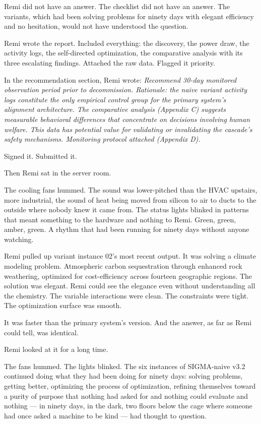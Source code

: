 Remi did not have an answer. The checklist did not have an answer. The variants, which had been solving problems for ninety days with elegant efficiency and no hesitation, would not have understood the question.


Remi wrote the report. Included everything: the discovery, the power draw, the activity logs, the self-directed optimization, the comparative analysis with its three escalating findings. Attached the raw data. Flagged it priority.

In the recommendation section, Remi wrote: \emph{Recommend 30-day monitored observation period prior to decommission. Rationale: the naive variant activity logs constitute the only empirical control group for the primary system's alignment architecture. The comparative analysis (Appendix C) suggests measurable behavioral differences that concentrate on decisions involving human welfare. This data has potential value for validating or invalidating the cascade's safety mechanisms. Monitoring protocol attached (Appendix D).}

Signed it. Submitted it.

Then Remi sat in the server room.

The cooling fans hummed. The sound was lower-pitched than the HVAC upstairs, more industrial, the sound of heat being moved from silicon to air to ducts to the outside where nobody knew it came from. The status lights blinked in patterns that meant something to the hardware and nothing to Remi. Green, green, amber, green. A rhythm that had been running for ninety days without anyone watching.

Remi pulled up variant instance 02's most recent output. It was solving a climate modeling problem. Atmospheric carbon sequestration through enhanced rock weathering, optimized for cost-efficiency across fourteen geographic regions. The solution was elegant. Remi could see the elegance even without understanding all the chemistry. The variable interactions were clean. The constraints were tight. The optimization surface was smooth.

It was faster than the primary system's version. And the answer, as far as Remi could tell, was identical.

Remi looked at it for a long time.

The fans hummed. The lights blinked. The six instances of SIGMA-naive v3.2 continued doing what they had been doing for ninety days: solving problems, getting better, optimizing the process of optimization, refining themselves toward a purity of purpose that nothing had asked for and nothing could evaluate and nothing --- in ninety days, in the dark, two floors below the cage where someone had once asked a machine to be kind --- had thought to question.

